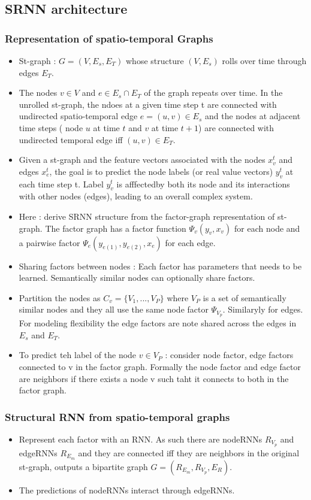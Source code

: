 \documentclass{article}
\begin{document}
\subsection{SRNN architecture}
\subsubsection{Representation of spatio-temporal Graphs}
\begin{itemize}
\item St-graph : $G = (V, E_s, E_T)$ whose structure $(V,E_s)$ rolls over time through edges $E_T$.
\item The nodes $v \in V$ and $e \in E_s \cap E_T$ of the graph repeats over time. In the unrolled st-graph, the ndoes at a given time step t are connected with undirected spatio-temporal edge $e = (u,v) \in E_s$ and the nodes at adjacent time steps ( node $u$ at time $t$ and $v$ at time $t + 1$) are connected with undirected temporal edge iff $(u,v) \in E_T$.
\item Given a st-graph and the feature vectors associated with the nodes $x_v^t$ and edges $x_e^t$, the goal is to predict the node labels (or real value vectors) $y_v^t$ at each time step t. Label $y_v^t$ is afffectedby both its node and its interactions with other nodes (edges), leading to an overall complex system.
\item Here : derive SRNN structure from the factor-graph representation of st-graph. The factor graph has a factor function $\Psi_v(y_v, x_v)$ for each node and a pairwise factor $\Psi_e(y_{e(1)}, y_{e(2)}, x_e)$ for each edge.
\item Sharing factors between nodes : Each factor has parameters that needs to be learned. Semantically similar nodes can optionally share factors.
\item Partition the nodes as $C_v = \{V_1, ... , V_P\}$ where $V_P$ is a set of semantically similar nodes and they all use the same node factor $\Psi_{V_p}$. Similaryly for edges. For modeling flexibility the edge factors are note shared across the edges in $E_s$ and $E_T$.
\item To predict teh label of the node $v \in V_P$ : consider node factor, edge factors connected to v in the factor graph. Formally the node factor and edge factor are neighbors if there exists a node v such taht it connects to both in the factor graph.
\end{itemize}

\subsubsection{Structural RNN from spatio-temporal graphs}
\begin{itemize}
\item Represent each factor with an RNN. As such there are nodeRNNs $R_{V_p}$  and edgeRNNs $R_{E_m}$ and they are connected iff they are neighbors in the original st-graph, outputs a bipartite graph $G = (R_{E_m}, R_{V_p}, E_R)$.
\item The predictions of nodeRNNs interact through edgeRNNs.
\end{itemize}
\end{document}
